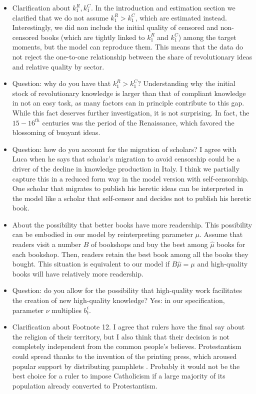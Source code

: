 \begin{itemize}
\item Clarification about $k_1^R, k_1^C$. In the introduction and estimation section we clarified that we do not assume $k_1^R>k_1^C$, which are estimated instead. Interestingly, we did non include the initial quality of censored and non-censored books (which are tightly linked to $k_1^R$ and $k_1^C$) among the target moments, but the model can reproduce them. This means that the data do not reject the one-to-one relationship between the share of revolutionary ideas and relative quality by sector.

\item Question: why do you have that $k_1^R>k_1^C$? Understanding why the initial stock of revolutionary knowledge is larger than that of compliant knowledge in not an easy task, as many factors can in principle contribute to this gap. While this fact deserves further investigation, it is not surprising. In fact, the $15-16^{th}$ centuries was the period of the Renaissance, which favored the blossoming of buoyant ideas.

\item Question: how do you account for the migration of scholars? I agree with Luca when he says that scholar's migration to avoid censorship could be a driver of the decline in knowledge production in Italy. I think we partially capture this in a reduced form way in the model version with self-censorship. One scholar that migrates to publish his heretic ideas can be interpreted in the model like a scholar that self-censor and decides not to publish his heretic book.


\item About the possibility that better books have more readership. This possibility can be embodied in our model by reinterpreting parameter $\mu$. Assume that readers visit a number $B$ of bookshops and buy the best among $\hat{\mu}$ books for each bookshop. Then, readers retain the best book among all the books they bought. This situation is equivalent to our model if $B\hat{\mu}=\mu$ and high-quality books will have relatively more readership.


\item Question: do you allow for the possibility that high-quality work facilitates the creation of new high-quality knowledge? Yes: in our specification, parameter $\nu$ multiplies $b_t^i$.  

\item Clarification about Footnote 12. I agree that rulers have the final say about the religion of their territory, but I also think that their decision is not completely independent from the common people's believes. Protestantism could spread thanks to the invention of the printing press, which aroused popular support by distributing pamphlets \cite{eisenstein1980,rubin2014}. Probably it would not be the best choice for a ruler to impose Catholicism if a large majority of its population already converted to Protestantism.


\end{itemize}
